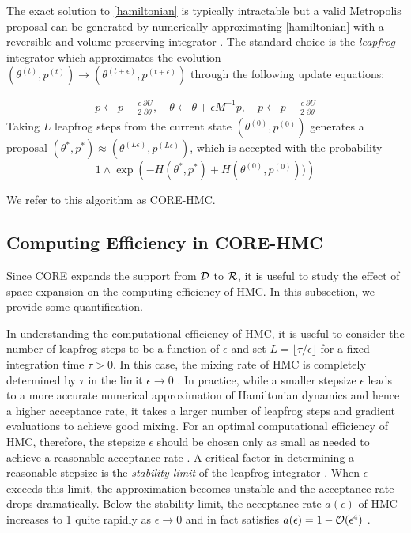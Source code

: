 \documentclass[10pt,fleqn]{article}
\DeclareMathOperator{\1}{\mathbbm{1}} \DeclareMathOperator{\bigO}{\mc O}
\newcommand{\dt}{\epsilon} %
\newcommand{\mass}{M} %
\begin{document}
The exact solution to \eqref{hamiltonian} is typically intractable but a
valid Metropolis proposal can be generated by numerically approximating
\eqref{hamiltonian} with a reversible and volume-preserving  integrator
\citep{neal2011mcmc}. The standard choice is the \textit{leapfrog}
integrator which approximates the evolution $(\theta^{(t)},p^{(t)}) \to (\theta^{(t +
\dt)},p^{(t + \dt)})$ through the following update equations:

\begin{equation} \begin{aligned} \label{leap-frog}
p \leftarrow p -
\frac{\dt}{2} \frac{\partial U}{\partial  \theta },\quad \theta \leftarrow  \theta
+ \dt \mass^{-1}p,\quad p \leftarrow p -  \frac{\dt}{2}
\frac{\partial U}{\partial  \theta }\end{aligned} \end{equation} Taking
$L$ leapfrog steps from the current state $(\theta^{(0)},p^{(0)})$
generates a proposal $(\theta^{*},p^{*}) \approx (\theta^{(L \dt)},p^{(L
\dt)})$, which is accepted with the probability $$1\wedge \exp
\left( - H(\theta^{*},p^{*}) + H(\theta^{(0)},p^{(0)}))\right)$$

We refer to this algorithm as CORE-HMC.

\subsection{Computing Efficiency in CORE-HMC}

Since CORE expands the support from $\mathcal{D}$ to $\mathcal{R}$, it is useful to
study the effect of space expansion on the computing efficiency of HMC. In this
subsection, we provide some quantification.

In understanding the computational efficiency of HMC, it is useful to
consider the number of leapfrog steps to be a function of $\dt$ and set $L
= \lfloor \tau / \dt \rfloor$ for a fixed integration time $\tau > 0$. In
this case, the mixing rate of HMC is completely determined by $\tau$ in the
limit $\dt \to 0$ \citep{betancourt17}. In practice, while a smaller
stepsize $\dt$ leads to a more accurate numerical approximation of
Hamiltonian dynamics and hence a higher acceptance rate, it takes a larger
number of leapfrog steps and gradient evaluations to achieve good mixing.
For an optimal computational efficiency of HMC, therefore, the stepsize
$\dt$ should be chosen only as small as needed to achieve a reasonable
acceptance rate \citep{beskos13, betancourt14}. A critical factor in
determining a reasonable stepsize is the \textit{stability limit} of the
leapfrog integrator \citep{neal2011mcmc}. When $\dt$ exceeds this limit,
the approximation becomes unstable and the acceptance rate drops
dramatically. Below the stability limit, the acceptance rate $a(\dt)$ of
HMC increases to 1 quite rapidly as $\dt \to 0$ and in fact satisfies
$a(\dt) = 1 - \mc O(\dt^4)$ \citep{beskos13}.
\end{document}
